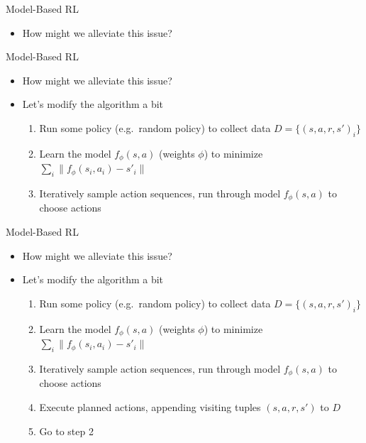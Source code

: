 \begin{frame}{Model-Based RL}
\begin{itemize}
    \item How might we alleviate this issue?
\end{itemize}
\end{frame}

\begin{frame}{Model-Based RL}
\begin{itemize}
    \item How might we alleviate this issue?
    \item Let's modify the algorithm a bit
    \begin{enumerate}
        \item Run some policy (e.g.\ random policy) to collect data
              $D = \{(s, a, r, s')_i\}$
        \item Learn the model $f_\phi(s, a)$ (weights $\phi$) to minimize
              $\sum_i \lVert f_\phi(s_i, a_i) - s'_i \rVert$
        \item Iteratively sample action sequences, run through model $f_\phi(s, a)$ to
              choose actions
    \end{enumerate}
\end{itemize}
\end{frame}

\begin{frame}{Model-Based RL}
\begin{itemize}
    \item How might we alleviate this issue?
    \item Let's modify the algorithm a bit
    \begin{enumerate}
        \item Run some policy (e.g.\ random policy) to collect data
              $D = \{(s, a, r, s')_i\}$
        \item Learn the model $f_\phi(s, a)$ (weights $\phi$) to minimize
              $\sum_i \lVert f_\phi(s_i, a_i) - s'_i \rVert$
        \item Iteratively sample action sequences, run through model $f_\phi(s, a)$ to
              choose actions
        \item Execute planned actions, appending visiting tuples $(s, a, r, s')$ to $D$
        \item Go to step 2
    \end{enumerate}
\end{itemize}
\end{frame}

